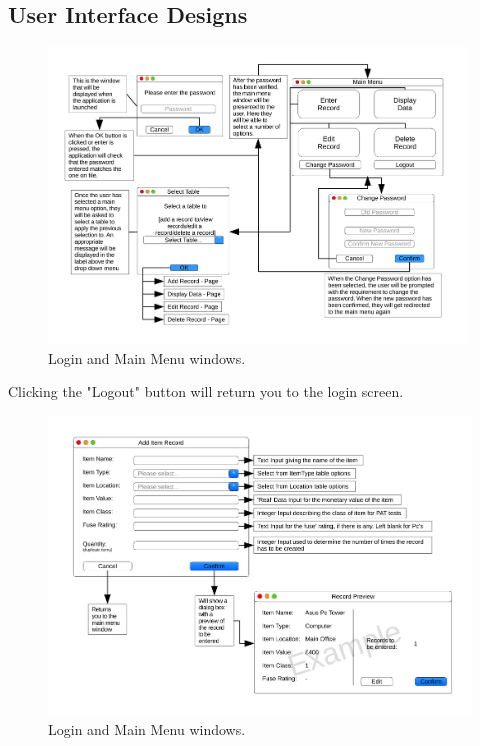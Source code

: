 \begin{landscape}

\section{User Interface Designs}

\begin{figure}[H]
    \begin{center}
        \includegraphics[width=420px]{./Design/user_interface/login_interface.pdf}
    \end{center}
    \caption{Login and Main Menu windows.} \label{fig:print_function_result}
\end{figure}

\begin{center}
    Clicking the "Logout" button will return you to the login screen.
\end{center}

\newpage

\begin{figure}[H]
    \begin{center}
        \includegraphics[width=500px]{./Design/user_interface/Add_item_record_interface.pdf}
    \end{center}
    \caption{Login and Main Menu windows.} \label{fig:print_function_result}
\end{figure}


\end{landscape}
